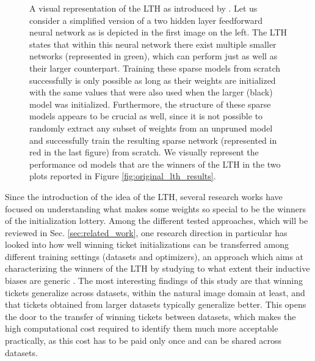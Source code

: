 \begin{figure}[!htb]
\endminipage
\caption{A visual representation of the LTH as introduced by \citet{frankle2018lottery}. Let us consider a simplified version of a two hidden layer feedforward neural network as is depicted in the first image on the left. The LTH states that within this neural network there exist multiple smaller networks (represented in green), which can perform just as well as their larger counterpart. Training these sparse models from scratch successfully is only possible as long as their weights are initialized with the same values that were also used when the larger (black) model was initialized. Furthermore, the structure of these sparse models appears to be crucial as well, since it is not possible to randomly extract any subset of weights from an unpruned model and successfully train the resulting sparse network (represented in red in the last figure) from scratch. We visually represent the performance od models that are the winners of the LTH in the two plots reported in Figure \ref{fig:original_lth_results}.}	
\label{fig:tickets_visualization}
\end{figure}



Since the introduction of the idea of the LTH, several research works have focused on understanding what makes some weights so special to be the winners of the initialization lottery. Among the different tested approaches, which will be reviewed in Sec. \ref{sec:related_work}, one research direction in particular has looked into how well winning ticket initializations can be transferred among different training settings (datasets and optimizers), an approach which aims at characterizing the winners of the LTH by studying to what extent their inductive biases are generic \cite{morcos2019one}. The most interesting findings of this study are that winning tickets generalize across datasets, within the natural image domain at least, and that tickets obtained from larger datasets typically generalize better. This opens the door to the transfer of winning tickets between datasets, which makes the high computational cost required to identify them much more acceptable practically, as this cost has to be paid only once and can be shared across datasets.

